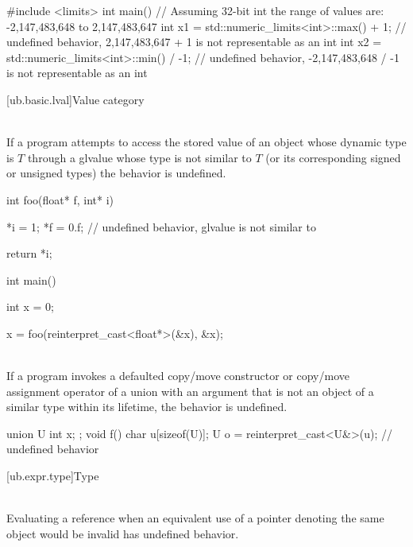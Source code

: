 \pnum
\begin{example}
\begin{codeblock}
#include <limits>
int main() {
  // Assuming 32-bit int the range of values are: -2,147,483,648 to 2,147,483,647
  int x1 = std::numeric_limits<int>::max() + 1;     // undefined behavior, 2,147,483,647 + 1 is not representable as an int
  int x2 = std::numeric_limits<int>::min() / -1;    // undefined behavior, -2,147,483,648 / -1 is not representable as an int
}
\end{codeblock}
\end{example}

[ub.basic.lval]{Value category}

\pnum
{} \\
If a program attempts to access  the stored value of an object
whose dynamic type is $T$ through a glvalue whose type is not
similar  to $T$ (or its corresponding signed or unsigned types)
the behavior is undefined.

\pnum
\begin{example}
\begin{codeblock}
int foo(float* f, int* i) {
  *i = 1;
  *f = 0.f;     // undefined behavior, glvalue is not similar to 

  return *i;
}

int main() {
  int x = 0;

  x = foo(reinterpret_cast<float*>(&x), &x);
}
\end{codeblock}
\end{example}

\pnum
{} \\
If a program invokes a defaulted copy/move constructor or copy/move assignment
operator of a union with an argument that is not an object of a similar type
within its lifetime, the behavior is undefined.

\pnum
\begin{example}
\begin{codeblock}
union U { int x; };
void f()
{
   char u[sizeof(U)];
   U o = reinterpret_cast<U&>(u);   // undefined behavior
}
\end{codeblock}
\end{example}

[ub.expr.type]{Type}

\pnum
{} \\
Evaluating a reference when an equivalent use of a pointer denoting the same object
would be invalid has undefined behavior.

